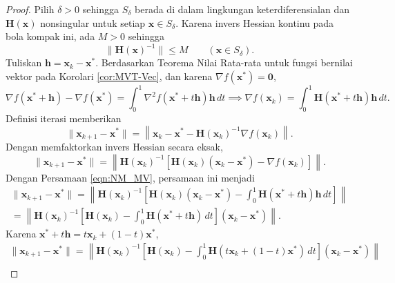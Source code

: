\begin{proof} Pilih $\delta>0$ sehingga $S_\delta$ berada di dalam lingkungan keterdiferensialan dan $\mathbf{H}(\mathbf{x})$ nonsingular untuk setiap $\mathbf{x}\in S_\delta$. Karena invers Hessian kontinu pada bola kompak ini, ada $M>0$ sehingga
\begin{displaymath}
\lVert\mathbf{H}(\mathbf{x})^{-1}\rVert\leq M
\qquad(\mathbf{x}\in S_\delta).
\end{displaymath}
Tuliskan $\mathbf{h}=\mathbf{x}_k-\mathbf{x}^*$. Berdasarkan Teorema Nilai Rata-rata untuk fungsi bernilai vektor pada Korolari \ref{cor:MVT-Vec}, dan karena $\nabla f(\mathbf{x}^*)=\mathbf{0}$,
\begin{equation}
\nabla f(\mathbf{x}^*+\mathbf{h})-\nabla f(\mathbf{x}^*)
=\int_0^1\nabla^2f(\mathbf{x}^*+t\mathbf{h})\mathbf{h}\,dt
\implies
\nabla f(\mathbf{x}_k)=\int_0^1\mathbf{H}(\mathbf{x}^*+t\mathbf{h})\mathbf{h}\,dt.
\label{eqn:NM_MV}
\end{equation}
Definisi iterasi memberikan
\begin{equation}
\lVert\mathbf{x}_{k+1}-\mathbf{x}^*\rVert
=\left\lVert\mathbf{x}_k-\mathbf{x}^*
-\mathbf{H}(\mathbf{x}_k)^{-1}\nabla f(\mathbf{x}_k)\right\rVert.
\end{equation}
Dengan memfaktorkan invers Hessian secara eksak,
\begin{equation}
\lVert\mathbf{x}_{k+1}-\mathbf{x}^*\rVert
=\left\lVert\mathbf{H}(\mathbf{x}_k)^{-1}
\left[\mathbf{H}(\mathbf{x}_k)(\mathbf{x}_k-\mathbf{x}^*)
-\nabla f(\mathbf{x}_k)\right]\right\rVert.
\end{equation}
Dengan Persamaan \ref{eqn:NM_MV}, persamaan ini menjadi
\begin{multline}
\lVert\mathbf{x}_{k+1}-\mathbf{x}^*\rVert
=\left\lVert\mathbf{H}(\mathbf{x}_k)^{-1}
\left[\mathbf{H}(\mathbf{x}_k)(\mathbf{x}_k-\mathbf{x}^*)
-\int_0^1\mathbf{H}(\mathbf{x}^*+t\mathbf{h})\mathbf{h}\,dt\right]\right\rVert\\
=\left\lVert\mathbf{H}(\mathbf{x}_k)^{-1}
\left[\mathbf{H}(\mathbf{x}_k)-\int_0^1\mathbf{H}(\mathbf{x}^*+t\mathbf{h})\,dt\right]
(\mathbf{x}_k-\mathbf{x}^*)\right\rVert.
\end{multline}
Karena $\mathbf{x}^*+t\mathbf{h}=t\mathbf{x}_k+(1-t)\mathbf{x}^*$,
\begin{multline}
\lVert\mathbf{x}_{k+1}-\mathbf{x}^*\rVert
=\left\lVert\mathbf{H}(\mathbf{x}_k)^{-1}
\left[\mathbf{H}(\mathbf{x}_k)-
\int_0^1\mathbf{H}(t\mathbf{x}_k+(1-t)\mathbf{x}^*)\,dt\right]
(\mathbf{x}_k-\mathbf{x}^*)\right\rVert\\

\end{multline}
\end{proof}
